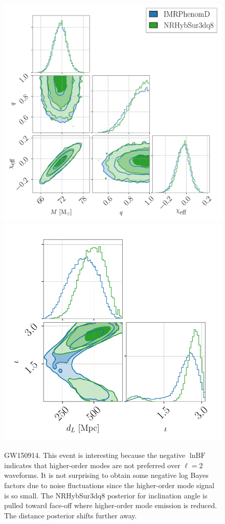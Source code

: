 \documentclass[prd,superscriptaddress,twocolumn,nopreprintnumbers,floatfix,longbibliography]{revtex4}
\newcommand{\sur}{{\sc NRHybSur3dq8}\xspace}
\newcommand{\ep}[1]{\textcolor{red}{[EP: #1]}}
\begin{document}
\begin{appendix}
\begin{figure}[t!]
    \centering
    \includegraphics[width=0.56\linewidth]{GW150914_marg_intrinsic.pdf}
    \includegraphics[width=0.405\linewidth]{GW150914_marg_extrinsic.pdf}
    \caption{
    GW150914. This event is interesting because the negative $\ln\text{BF}$ indicates that higher-order modes are not preferred over $\ell=2$ waveforms.
    It is not surprising to obtain some negative log Bayes factors due to noise fluctuations since the higher-order mode signal is so small.
    The \sur posterior for inclination angle is pulled toward face-off where higher-order mode emission is reduced.
    The distance posterior shifts further away.
    }
    \label{fig:GW150914}
\end{figure}


\end{appendix}
\end{document}
